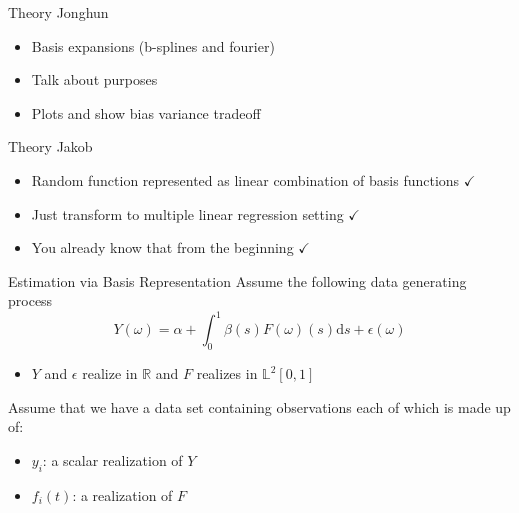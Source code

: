\documentclass{beamer}
\begin{document}
	\begin{frame}{Theory}
		Jonghun
		\begin{itemize}
			\item Basis expansions (b-splines and fourier)
			\item Talk about purposes
			\item Plots and show bias variance tradeoff
		\end{itemize}
	\end{frame}

	\begin{frame}{Theory}
		Jakob
		\begin{itemize}
			\item Random function represented as linear combination of basis functions $\checkmark$
			\item Just transform to multiple linear regression setting $\checkmark$
			\item You already know that from the beginning $\checkmark$
		\end{itemize}
	\end{frame}

	\begin{frame}{Estimation via Basis Representation}
		Assume the following data generating process
		$$Y(\omega) = \alpha + \int_{0}^{1} \beta(s) F(\omega)(s) \mathrm{d}s + \epsilon(\omega)$$
		\begin{itemize}
			\item $Y$ and $\epsilon$ realize in $\mathbb{R}$ and $F$ realizes in $\mathbb{L}^2[0,1]$
		\end{itemize}
		\vspace{0.2cm}
		
		Assume that we have a data set containing observations each of which is made up of:
		\begin{itemize}
			\item $y_i$: a scalar realization of $Y$
			\item $f_i(t)$: a realization of $F$
		\end{itemize}

	\end{frame}
\end{document}
